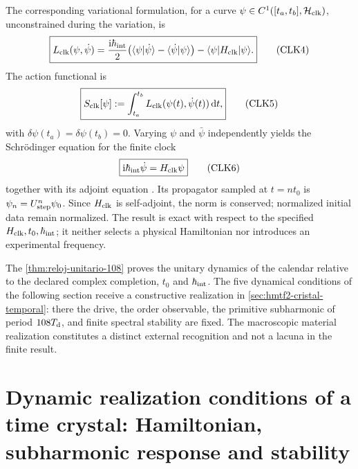 The corresponding variational formulation, for a curve
\(\psi\in C^1([t_a,t_b],\mathcal H_{\rm clk})\), unconstrained during the
variation, is
\[
 \boxed{
 L_{\rm clk}(\psi,\dot\psi)
 =\frac{\mathrm i\hbar_{\rm int}}2
 \bigl(
 \langle\psi|\dot\psi\rangle
 -\langle\dot\psi|\psi\rangle
 \bigr)
 -\langle\psi|H_{\rm clk}|\psi\rangle.}
 \tag{CLK4}\label{eq:lagrangiano-reloj-108}
\]
The action functional is
\[
 \boxed{
 S_{\rm clk}[\psi]
 :=\int_{t_a}^{t_b}
 L_{\rm clk}(\psi(t),\dot\psi(t))\,\mathrm dt,}
 \tag{CLK5}\label{eq:accion-reloj-108}
\]
with \(\delta\psi(t_a)=\delta\psi(t_b)=0\).
Varying \(\psi\) and \(\bar\psi\) independently yields the
Schrödinger equation for the finite clock
\[
 \boxed{\mathrm i\hbar_{\rm int}\dot\psi=H_{\rm clk}\psi}
 \tag{CLK6}\label{eq:schrodinger-reloj-108}
\]
together with its adjoint equation \cite{SchrodingerNobel}. Its propagator sampled
at \(t=nt_0\) is \(\psi_n=U_{\rm step}^{n}\psi_0\). Since \(H_{\rm clk}\) is
self-adjoint, the norm is conserved; normalized initial data remain
normalized. The result is exact with respect to the specified
\(H_{\rm clk},t_0,\hbar_{\rm int}\); it neither selects a physical Hamiltonian
nor introduces an experimental frequency.

The \cref{thm:reloj-unitario-108} proves the unitary dynamics of the calendar relative to the declared complex completion, \(t_0\) and \(\hbar_{\rm int}\). The five dynamical conditions of the following section receive a constructive realization in \cref{sec:hmtf2-cristal-temporal}: there the drive, the order observable, the primitive subharmonic of period \(108T_{\rm d}\), and finite spectral stability are fixed. The macroscopic material realization constitutes a distinct external recognition and not a lacuna in the finite result.

\section{Dynamic realization conditions of a time crystal: Hamiltonian, subharmonic response and stability}
\label{sec:programa-cristal-tiempo}

